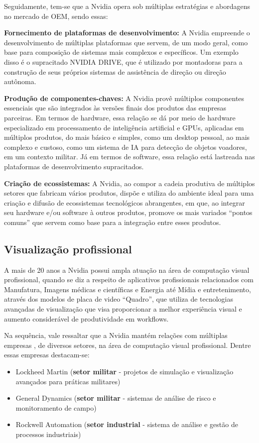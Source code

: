\documentclass[conference]{IEEEtran}
\begin{document}
\par Seguidamente, tem-se que a Nvidia opera sob múltiplas estratégias e abordagens no mercado de OEM, sendo essas:


\par \textbf{Fornecimento de plataformas de desenvolvimento:} A Nvidia empreende o desenvolvimento de múltiplas plataformas que servem, de um modo geral, como base para composição de sistemas mais complexos e específicos. Um exemplo disso é o supracitado NVIDIA DRIVE, que é utilizado por montadoras para a construção de seus próprios sistemas de assistência de direção ou direção autônoma.


\par \textbf{Produção de componentes-chaves:} A Nvidia provê múltiplos componentes essenciais que são integrados às versões finais dos produtos das empresas parceiras. Em termos de hardware, essa relação se dá por meio de hardware especializado em processamento de inteligência artificial e GPUs, aplicadas em múltiplos produtos, do mais básico e simples, como um desktop pessoal, ao mais complexo e custoso, como um sistema de IA para detecção de objetos voadores, em um contexto militar. Já em termos de software, essa relação está lastreada nas plataformas de desenvolvimento supracitados.


\par \textbf{Criação de ecossistemas:} A Nvidia, ao compor a cadeia produtiva de múltiplos setores que fabricam vários produtos, dispõe e utiliza do ambiente ideal para uma criação e difusão de ecossistemas tecnológicos abrangentes, em que, ao integrar seu hardware e/ou software à outros produtos, promove os mais variados “pontos comuns” que servem como base para a integração entre esses produtos.

\subsection{\textbf{Visualização profissional}} 
A mais de 20 anos a Nvidia possui ampla atuação na área de computação visual profissional, quando se diz a respeito de aplicativos profissionais relacionados com  Manufatura, Imagens médicas e científicas e Energia até Mídia e entretenimento, através dos modelos de placa de video “Quadro”, que utiliza de tecnologias avançadas de visualização que visa proporcionar a melhor experiência visual e aumento considerável de produtividade em workflows.

Na sequência, vale ressaltar que a Nvidia mantém relações com múltiplas empresas , de diversos setores, na área de computação visual profissional. Dentre essas empresas destacam-se:
\begin{itemize}[h]
    \item Lockheed Martin (\textbf{setor militar} - projetos de simulação e visualização avançados para práticas militares)
    \item General Dynamics (\textbf{setor militar}  - sistemas de análise de risco e monitoramento de campo)
    \item Rockwell Automation (\textbf{setor industrial} - sistema de análise e gestão de processos industriais)
\end{itemize}
\end{document}
